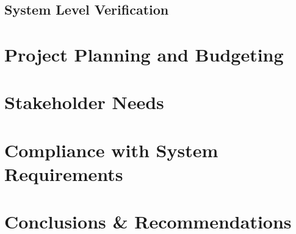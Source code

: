\documentclass[letterpaper,11pt]{article}
\begin{document}
\subsection{System Level Verification} %

\section{Project Planning and Budgeting} %

\section{Stakeholder Needs} %


\section{Compliance with System Requirements} %


\section{Conclusions \& Recommendations} %
\end{document}
